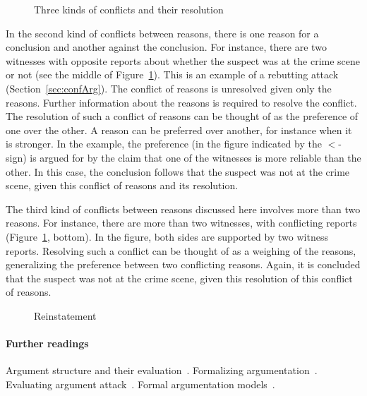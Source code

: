 \documentclass[10pt]{article}
\begin{document}
\begin{figure}[bt]
\centering

\caption{Three kinds of conflicts and their resolution\label{fig:conflicts}}
\end{figure}

In the second kind of conflicts between reasons, there is one reason for a conclusion and another against the conclusion. For instance, there are two witnesses with opposite reports about whether the suspect was at the crime scene or not (see the middle of Figure~\ref{fig:conflicts}). This is an example of a rebutting attack (Section~\ref{sec:confArg}). The conflict of reasons is unresolved given only the reasons. Further information about the reasons is required to resolve the conflict. The resolution of such a conflict of reasons can be thought of as the preference of one over the other. A reason can be preferred over another, for instance when it is stronger. In the example, the preference (in the figure indicated by the $<$-sign) is argued for by the claim that one of the witnesses is more reliable than the other. In this case, the conclusion follows that the suspect was not at the crime scene, given this conflict of reasons and its resolution. 

The third kind of conflicts between reasons discussed here involves more than two reasons. For instance, there are more than two witnesses, with conflicting reports (Figure~\ref{fig:conflicts}, bottom). In the figure, both sides are supported by two witness reports. Resolving such a conflict can be thought of as a weighing of the reasons, generalizing the preference between two conflicting reasons. Again, it is concluded that the suspect was not at the crime scene, given this resolution of this conflict of reasons.





\begin{figure}[bt]
\centering

\caption{Reinstatement\label{fig:reinstatement}}
\end{figure}


\paragraph{Further readings}
Argument structure and their evaluation~\citep{pollock1995}. Formalizing argumentation~\citep{prakkenVreeswijk2002}. Evaluating argument attack~\citep{dung1995}. Formal argumentation models~\citep{simariLoui1992, vreeswijk1997, prakken2010, verheij2003deflog, gordonEtal2007}. 
\end{document}
